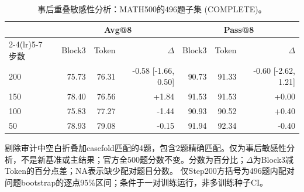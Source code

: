 \begin{table}[t]
\centering
\scriptsize
\setlength{\tabcolsep}{4pt}
\caption{事后重叠敏感性分析：MATH500的496题子集 (COMPLETE)。}
\label{tab:qwen4overlapsensitivity}
\begin{tabular}{lrrrrrr}
\toprule
 & \multicolumn{3}{c}{Avg@8} & \multicolumn{3}{c}{Pass@8} \\
\cmidrule(lr){2-4}\cmidrule(lr){5-7}
步数 & Block3 & Token & $\Delta$ & Block3 & Token & $\Delta$ \\
\midrule
200 & 75.73 & 76.31 & -0.58 [-1.66, 0.50] & 90.73 & 91.33 & -0.60 [-2.62, 1.21] \\
150 & 78.40 & 76.56 & +1.84 & 91.53 & 91.53 & +0.00 \\
100 & 75.83 & 77.27 & -1.44 & 90.93 & 90.52 & +0.40 \\
50 & 78.93 & 79.08 & -0.15 & 91.94 & 92.34 & -0.40 \\
\bottomrule
\end{tabular}
\par\smallskip\footnotesize 剔除审计中空白折叠加casefold匹配的4题，包含2题精确匹配。仅为事后敏感性分析，不是新基准或主结果；官方全500题分数不变。分数为百分比；$\Delta$为Block3减Token的百分点差；NA表示缺少配对题目分数。 仅Step200方括号为496题内配对问题bootstrap的逐点95\%区间；条件于一对训练运行，非多训练种子CI。
\end{table}
